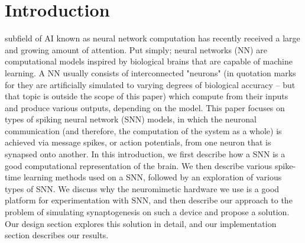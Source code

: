 \documentclass[journal]{./sty/IEEEtran}
\begin{document}
\section{Introduction}
 subfield of AI known as neural network computation has recently received a large and growing amount of attention. Put simply; neural networks (NN) are computational models inspired by biological brains that are capable of machine learning. A NN usually consists of interconnected "neurons" (in quotation marks for they are artificially simulated to varying degrees of biological accuracy -- but that topic is outside the scope of this paper) which compute from their inputs and produce various outputs, depending on the model. This paper focuses on types of spiking neural network (SNN) models, in which the neuronal communication (and therefore, the computation of the system as a whole) is achieved via message spikes, or action potentials, from one neuron that is synapsed onto another. In this introduction, we first describe how a SNN is a good computational representation of the brain. We then describe various spike-time learning methods used on a SNN, followed by an exploration of various types of SNN. We discuss why the neuromimetic hardware we use is a good platform for experimentation with SNN, and then describe our approach to the problem of simulating synaptogenesis on such a device and propose a solution. Our design section explores this solution in detail, and our implementation section describes our results.
\end{document}
